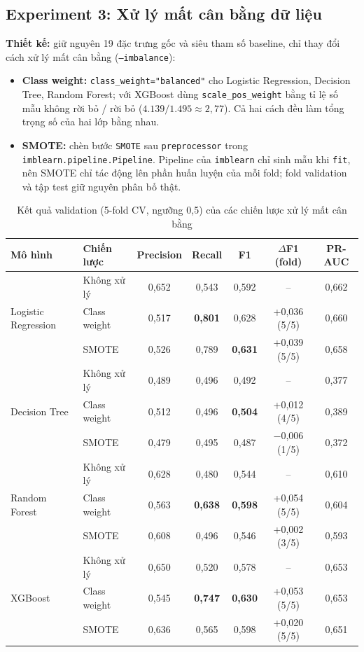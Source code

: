 \subsection{Experiment 3: Xử lý mất cân bằng dữ liệu}
\textbf{Thiết kế:} giữ nguyên 19 đặc trưng gốc và siêu tham số baseline, chỉ thay đổi cách xử lý mất cân bằng (\texttt{--imbalance}):
\begin{itemize}
    \item \textbf{Class weight:} \texttt{class\_weight="balanced"} cho Logistic Regression, Decision Tree, Random Forest; với XGBoost dùng \texttt{scale\_pos\_weight} bằng tỉ lệ số mẫu không rời bỏ / rời bỏ ($4.139 / 1.495 \approx 2{,}77$). Cả hai cách đều làm tổng trọng số của hai lớp bằng nhau.
    \item \textbf{SMOTE:} chèn bước \texttt{SMOTE} sau \texttt{preprocessor} trong \texttt{imblearn.pipeline.Pipeline}. Pipeline của \texttt{imblearn} chỉ sinh mẫu khi \texttt{fit}, nên SMOTE chỉ tác động lên phần huấn luyện của mỗi fold; fold validation và tập test giữ nguyên phân bố thật.
\end{itemize}

\begin{table}[H]
\centering
\small
\begin{tabular}{llccccc}
\toprule
\textbf{Mô hình} & \textbf{Chiến lược} & \textbf{Precision} & \textbf{Recall} & \textbf{F1} & \textbf{$\Delta$F1 (fold)} & \textbf{PR-AUC} \\
\midrule
\multirow{3}{*}{Logistic Regression} & Không xử lý & 0,652 & 0,543 & 0,592 & -- & 0,662 \\
 & Class weight & 0,517 & \textbf{0,801} & 0,628 & +0,036 (5/5) & 0,660 \\
 & SMOTE & 0,526 & 0,789 & \textbf{0,631} & +0,039 (5/5) & 0,658 \\
\midrule
\multirow{3}{*}{Decision Tree} & Không xử lý & 0,489 & 0,496 & 0,492 & -- & 0,377 \\
 & Class weight & 0,512 & 0,496 & \textbf{0,504} & +0,012 (4/5) & 0,389 \\
 & SMOTE & 0,479 & 0,495 & 0,487 & $-$0,006 (1/5) & 0,372 \\
\midrule
\multirow{3}{*}{Random Forest} & Không xử lý & 0,628 & 0,480 & 0,544 & -- & 0,610 \\
 & Class weight & 0,563 & \textbf{0,638} & \textbf{0,598} & +0,054 (5/5) & 0,604 \\
 & SMOTE & 0,608 & 0,496 & 0,546 & +0,002 (3/5) & 0,593 \\
\midrule
\multirow{3}{*}{XGBoost} & Không xử lý & 0,650 & 0,520 & 0,578 & -- & 0,653 \\
 & Class weight & 0,545 & \textbf{0,747} & \textbf{0,630} & +0,053 (5/5) & 0,653 \\
 & SMOTE & 0,636 & 0,565 & 0,598 & +0,020 (5/5) & 0,651 \\
\bottomrule
\end{tabular}
\caption{Kết quả validation (5-fold CV, ngưỡng 0,5) của các chiến lược xử lý mất cân bằng}
\label{tab:imbalance}
\end{table}


